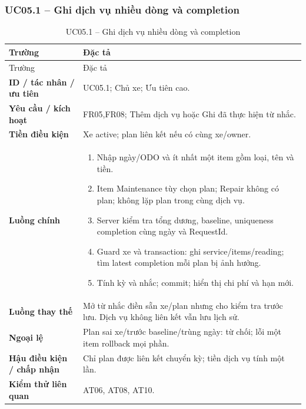 \subsubsection{UC05.1 -- Ghi dịch vụ nhiều dòng và completion}\label{uc:UC05.1}
\begin{smalltable}\begin{longtable}{L{3.2cm}L{11.8cm}}
\caption{UC05.1 -- Ghi dịch vụ nhiều dòng và completion}\label{tab:UC05.1}\\
\toprule Trường & Đặc tả\\\midrule\endfirsthead
\toprule Trường & Đặc tả\\\midrule\endhead
\textbf{ID / tác nhân / ưu tiên} & UC05.1; Chủ xe; Ưu tiên cao.\\
\textbf{Yêu cầu / kích hoạt} & FR05,FR08; Thêm dịch vụ hoặc Ghi đã thực hiện từ nhắc.\\
\textbf{Tiền điều kiện} & Xe active; plan liên kết nếu có cùng xe/owner.\\
\textbf{Luồng chính} & \begin{enumerate}[leftmargin=*,nosep]
\item Nhập ngày/ODO và ít nhất một item gồm loại, tên và tiền.
\item Item Maintenance tùy chọn plan; Repair không có plan; không lặp plan trong cùng dịch vụ.
\item Server kiểm tra tổng dương, baseline, uniqueness completion cùng ngày và RequestId.
\item Guard xe và transaction: ghi service/items/reading; tìm latest completion mỗi plan bị ảnh hưởng.
\item Tính kỳ và nhắc; commit; hiển thị chi phí và hạn mới.
\end{enumerate}\\
\textbf{Luồng thay thế} & Mở từ nhắc điền sẵn xe/plan nhưng cho kiểm tra trước lưu. Dịch vụ không liên kết vẫn lưu lịch sử.\\
\textbf{Ngoại lệ} & Plan sai xe/trước baseline/trùng ngày: từ chối; lỗi một item rollback mọi phần.\\
\textbf{Hậu điều kiện / chấp nhận} & Chỉ plan được liên kết chuyển kỳ; tiền dịch vụ tính một lần.\\
\textbf{Kiểm thử liên quan} & AT06, AT08, AT10.\\
\bottomrule\end{longtable}\end{smalltable}
